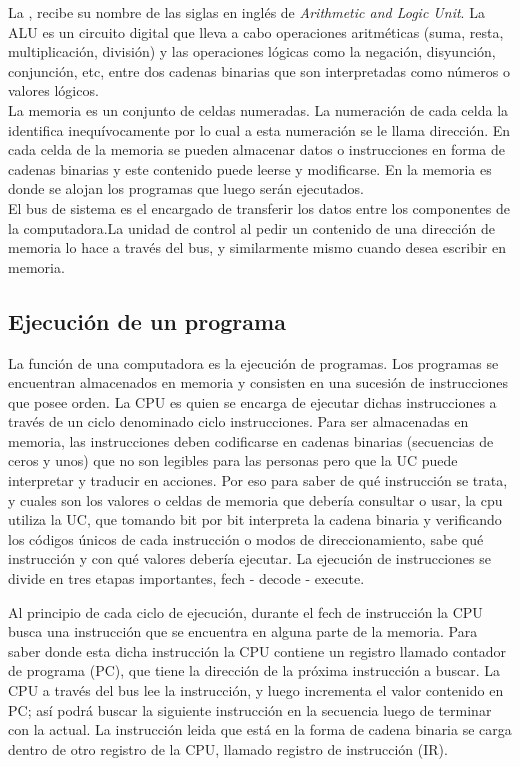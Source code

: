 La \ALU, recibe su nombre de las siglas en inglés de \textit{Arithmetic and Logic Unit}. La ALU es un circuito digital que lleva a cabo operaciones aritméticas (suma, resta, multiplicación, división) y las operaciones lógicas como la negación, disyunción, conjunción, etc, entre dos cadenas binarias que son interpretadas como números o valores lógicos.\\

La memoria es un conjunto de celdas numeradas. La numeración de cada celda la identifica inequívocamente por lo cual a esta numeración se le llama dirección. En cada celda de la memoria se pueden almacenar datos o instrucciones en forma de cadenas binarias y este contenido puede leerse y modificarse. En la memoria es donde se alojan los programas que luego serán ejecutados.\\

El bus de sistema es el encargado de transferir los datos entre los componentes de la computadora.La unidad de control al pedir un contenido de una dirección de memoria lo hace a través del bus, y similarmente mismo cuando desea escribir en memoria.

\subsection{Ejecución de un programa}

La función de una computadora es la ejecución de programas. Los programas se encuentran almacenados en memoria y consisten en una sucesión de instrucciones que posee orden. La CPU es quien se encarga de ejecutar dichas instrucciones a través de un ciclo denominado ciclo instrucciones. Para ser almacenadas en memoria, las instrucciones deben codificarse en cadenas binarias (secuencias de ceros y unos) que no son legibles para las personas pero que la UC puede interpretar y traducir en acciones. Por eso para saber de qué instrucción se trata, y cuales son los valores o celdas de memoria que debería consultar o usar, la cpu utiliza la UC, que tomando bit por bit interpreta la cadena binaria y verificando los códigos únicos de cada instrucción o modos de direccionamiento, sabe qué instrucción y con qué valores debería ejecutar. La ejecución de instrucciones se divide en tres etapas importantes, fech - decode - execute.

Al principio de cada ciclo de ejecución, durante el fech de instrucción la CPU busca una instrucción que se encuentra en alguna parte de la memoria. Para saber donde esta dicha instrucción la CPU contiene un registro llamado contador de programa (PC), que tiene la dirección de la próxima instrucción a buscar. La CPU a través del bus lee la instrucción, y luego incrementa el valor contenido en PC; así podrá buscar la siguiente instrucción en la secuencia luego de terminar con la actual. La instrucción leida que está en la forma de cadena binaria se carga dentro de otro registro de la CPU, llamado registro de instrucción (IR).

